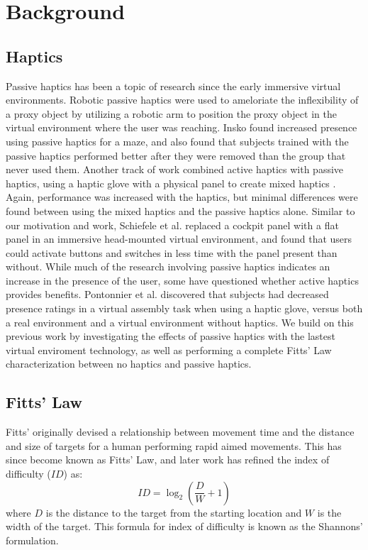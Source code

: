 \section{Background}

\subsection{Haptics}

Passive haptics has been a topic of research since the early immersive virtual environments.
Robotic passive haptics were used to ameloriate the inflexibility of a proxy object by utilizing a robotic arm to position the proxy object in the virtual environment where the user was reaching\cite{tachi_construction_1994,mcneely_robotic_1993}.
Insko\cite{insko_passive_2001} found increased presence using passive haptics for a maze, and also found that subjects trained with the passive haptics performed better after they were removed than the group that never used them.
Another track of work combined active haptics with passive haptics, using a haptic glove with a physical panel to create mixed haptics \cite{borst_evaluation_2005}.
Again, performance was increased with the haptics, but minimal differences were found between using the mixed haptics and the passive haptics alone.
Similar to our motivation and work, Schiefele et al.\cite{schiefele_simple_1998} replaced a cockpit panel with a flat panel in an immersive head-mounted virtual environment, and found that users could activate buttons and switches in less time with the panel present than without.
While much of the research involving passive haptics indicates an increase in the presence of the user, some have questioned whether active haptics provides benefits.
Pontonnier et al.\cite{pontonnier_designing_2014} discovered that subjects had decreased presence ratings in a virtual assembly task when using a haptic glove, versus both a real environment and a virtual environment without haptics.
We build on this previous work by investigating the effects of passive haptics with the lastest virtual enviroment technology, as well as performing a complete Fitts' Law characterization between no haptics and passive haptics.

\subsection{Fitts' Law}

Fitts' originally devised a relationship between movement time and the distance and size of targets for a human performing rapid aimed movements\cite{fitts_information_1954}.
This has since become known as Fitts' Law, and later work has refined the index of difficulty (${ID}$) as:
\begin{equation}
    {ID}=\log_2\left(\frac{D}{W}+1\right)
    \label{eq:index_of_difficulty}
\end{equation}
where $D$ is the distance to the target from the starting location and $W$ is the width of the target.
This formula for index of difficulty is known as the Shannons' formulation\cite{mackenzie_note_1989}.


